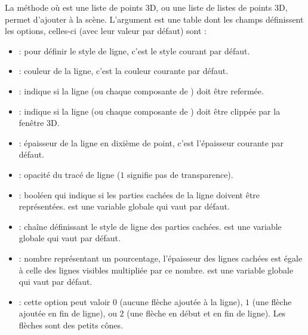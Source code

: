 La méthode  où  est une liste de points 3D, ou une liste de listes de points 3D, permet d'ajouter  à la scène. L'argument  est une table dont les champs définissent les options, celles-ci (avec leur valeur par défaut) sont :
    \begin{itemize}
        \item {} : pour définir le style de ligne, c'est le style courant par défaut.
        
        \item {} : couleur de la ligne, c'est la couleur courante par défaut.
        
        \item {} : indique si la ligne  (ou chaque composante de ) doit être refermée.
        
        \item {} : indique si la ligne  (ou chaque composante de ) doit être clippée par la fenêtre 3D.
        
        \item {} : épaisseur de la ligne en dixième de point, c'est l'épaisseur courante par défaut.
        
        \item {} : opacité du tracé de ligne ($1$ signifie pas de transparence).
        
        \item {} : booléen qui indique si les parties cachées de la ligne doivent être représentées.  est une variable globale qui vaut \false par défaut.
        
        \item {} : chaîne définissant le style de ligne des parties cachées.  est une variable globale qui vaut  par défaut.
        
        \item {} : nombre représentant un pourcentage, l'épaisseur des lignes cachées est égale à celle des lignes visibles multipliée par ce nombre.  est une variable globale qui vaut  par défaut.
        
        \item {} : cette option peut valoir $0$ (aucune flèche ajoutée à la ligne), $1$ (une flèche ajoutée en fin de ligne), ou $2$ (une flèche en début et en fin de ligne). Les flèches sont des petits cônes.
        

\end{itemize}
